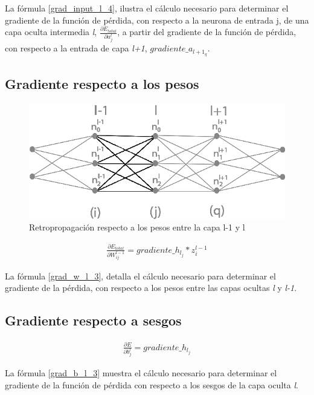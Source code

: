 La fórmula \ref{grad_input_l_4}, ilustra el cálculo necesario para determinar el gradiente de la función de pérdida, con respecto a la neurona de entrada j, de una capa oculta intermedia \textit{l}, $\frac{\partial E_{total}}{\partial a^l_j}$, a partir del gradiente de la función de pérdida, con respecto a la entrada de capa \textit{l+1}, $gradiente\_a_{{l+1}_q}$.


\subsection{Gradiente respecto a los pesos}

\begin{figure}[H]
	\centering
	\includegraphics[scale=0.35]{imagenes/conclusion_pesos.jpg}  
	\caption{Retropropagación respecto a los pesos entre la capa l-1 y l}
	\label{fig:conclusion_pesos}
\end{figure}

\begin{gather}
	\frac{\partial E_{total} }{\partial W^{l-1}_{ij} } = gradiente\_h_{l_j} * z^{l-1}_i \label{grad_w_l_3}
\end{gather}

La fórmula \ref{grad_w_l_3}, detalla el cálculo necesario para determinar el gradiente de la pérdida, con respecto a los pesos entre las capas ocultas \textit{l} y \textit{l-1}.

\subsection{Gradiente respecto a sesgos}

\begin{gather}
	\frac{\partial E}{\partial b^l_j} = gradiente\_h_{l_j} \label{grad_b_l_3}
\end{gather}

La fórmula \ref{grad_b_l_3} muestra el cálculo necesario para determinar el gradiente de la función de pérdida con respecto a los sesgos de la capa oculta \textit{l}.


